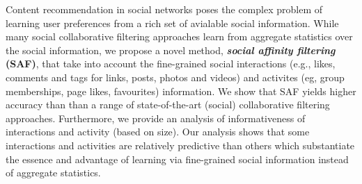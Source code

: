 Content recommendation in social networks poses the complex problem of
learning user preferences from a rich set of avialable social information.
While many social collaborative filtering approaches learn from aggregate statistics over the
social information, we propose a novel method, \textbf{\textit{social affinity filtering} (SAF)}, 
that take into account the fine-grained social interactions (e.g., likes, comments and tags for 
links, posts, photos and videos) and activites (eg, group memberships, page likes, favourites) 
information. We show that SAF yields higher accuracy than than a range of state-of-the-art 
(social) collaborative filtering approaches.
Furthermore, we provide an analysis of informativeness of interactions and activity (based
on size). 
Our analysis shows that some interactions and activities are relatively predictive than others which 
substantiate the essence and advantage of learning via fine-grained social information instead of
aggregate statistics.




